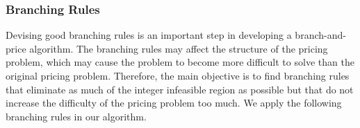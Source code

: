 
\subsubsection {Branching Rules} 
\label{branchingRule}
Devising good branching rules is an important step in developing a branch-and-price algorithm.
The branching rules may affect the structure of the pricing problem, which may cause the problem 
to become more difficult to solve than the original pricing problem. Therefore, the main 
objective is to find branching rules that eliminate as much of the integer infeasible region 
as possible but that do not increase the difficulty of the pricing problem too much. We apply 
the following branching rules in our algorithm.
